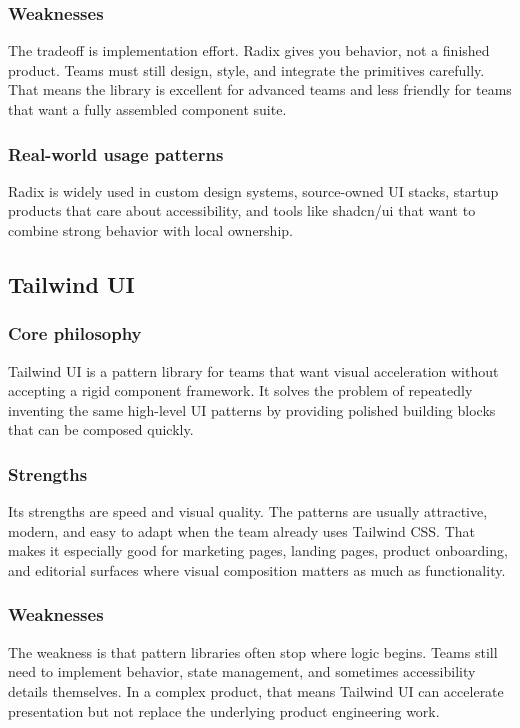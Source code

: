 \documentclass[11pt,twoside,a4paper]{article}
\begin{document}
\subsubsection{Weaknesses}
The tradeoff is implementation effort. Radix gives you behavior, not a finished product. Teams must still design, style, and integrate the primitives carefully. That means the library is excellent for advanced teams and less friendly for teams that want a fully assembled component suite.

\subsubsection{Real-world usage patterns}
Radix is widely used in custom design systems, source-owned UI stacks, startup products that care about accessibility, and tools like shadcn/ui that want to combine strong behavior with local ownership.

\subsection{Tailwind UI}
\subsubsection{Core philosophy}
Tailwind UI is a pattern library for teams that want visual acceleration without accepting a rigid component framework. It solves the problem of repeatedly inventing the same high-level UI patterns by providing polished building blocks that can be composed quickly.

\subsubsection{Strengths}
Its strengths are speed and visual quality. The patterns are usually attractive, modern, and easy to adapt when the team already uses Tailwind CSS. That makes it especially good for marketing pages, landing pages, product onboarding, and editorial surfaces where visual composition matters as much as functionality.

\subsubsection{Weaknesses}
The weakness is that pattern libraries often stop where logic begins. Teams still need to implement behavior, state management, and sometimes accessibility details themselves. In a complex product, that means Tailwind UI can accelerate presentation but not replace the underlying product engineering work.
\end{document}
